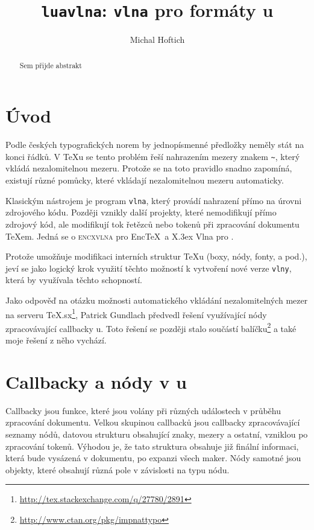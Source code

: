 \documentclass{csbulletin}
\begin{document}
\title{\texttt{luavlna}: \texttt{vlna} pro formáty u}
\author{Michal Hoftich}
\maketitle
\begin{abstract}
Sem přijde abstrakt
\end{abstract}

\section{Úvod}
Podle českých typografických norem by jednopísmenné předložky neměly stát na 
konci řádků. V \TeX u se tento problém řeší nahrazením mezery znakem \verb|~|,
který vkládá nezalomitelnou mezeru. Protože se na toto pravidlo snadno zapomíná,
existují různé pomůcky, které vkládají nezalomitelnou mezeru automaticky.

Klasickým nástrojem je program \verb|vlna|, který provádí nahrazení přímo na
úrovni zdrojového kódu. Později vznikly další projekty, které nemodifikují přímo
zdrojový kód, ale modifikují tok řetězců nebo tokenů při zpracování dokumentu 
\TeX em. Jedná se o \textsc{encxvlna} pro Enc\TeX\ a X\raisebox{\myminus.5ex}{Ǝ}\kern\myminus.3ex Vlna pro .

Protože  umožňuje modifikaci interních struktur \TeX u 
(boxy, nódy, fonty, a pod.), jeví se jako logický krok využití těchto možností
k vytvoření nové verze \verb|vlny|, která by využívala těchto schopností. 

Jako odpověď na otázku možnosti automatického vkládání nezalomitelných mezer 
na serveru TeX.sx\footnote{\url{http://tex.stackexchange.com/q/27780/2891}}, 
Patrick Gundlach předvedl řešení využívající nódy zpracovávající callbacky 
u. Toto řešení se později stalo součástí balíčku\footnote{%
\url{http://www.ctan.org/pkg/impnattypo}} a také moje řešení z něho vychází.

\section{Callbacky a nódy v u}




Callbacky jsou funkce, které jsou volány při různých událostech v průběhu
zpracování dokumentu. Velkou skupinou callbacků jsou callbacky zpracovávající 
seznamy nódů, datovou strukturu obsahující znaky, mezery a ostatní, vzniklou po
zpracování tokenů. Výhodou je, že tato struktura obsahuje již finální informaci,
která bude vysázená v dokumentu, po expanzi všech maker. Nódy samotné jsou 
objekty, které obsahují různá pole v závislosti na typu nódu.
\end{document}
